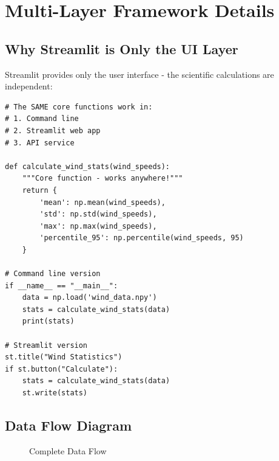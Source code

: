 \documentclass[12pt]{article}
\begin{document}
\section{Multi-Layer Framework Details}

\subsection{Why Streamlit is Only the UI Layer}

Streamlit provides only the user interface - the scientific calculations are independent:

\begin{lstlisting}[caption=Same Core Functions Work Everywhere]
# The SAME core functions work in:
# 1. Command line
# 2. Streamlit web app
# 3. API service

def calculate_wind_stats(wind_speeds):
    """Core function - works anywhere!"""
    return {
        'mean': np.mean(wind_speeds),
        'std': np.std(wind_speeds),
        'max': np.max(wind_speeds),
        'percentile_95': np.percentile(wind_speeds, 95)
    }

# Command line version
if __name__ == "__main__":
    data = np.load('wind_data.npy')
    stats = calculate_wind_stats(data)
    print(stats)

# Streamlit version
st.title("Wind Statistics")
if st.button("Calculate"):
    stats = calculate_wind_stats(data)
    st.write(stats)
\end{lstlisting}

\subsection{Data Flow Diagram}

\begin{figure}[H]
\centering
{}
\caption{Complete Data Flow}
\label{fig:dataflow}
\end{figure}
\end{document}
